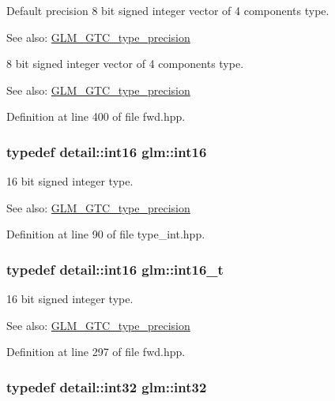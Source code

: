 Default precision 8 bit signed integer vector of 4 components type. \begin{Desc}
\item[See also:]\hyperlink{group__gtc__type__precision}{GLM\_\-GTC\_\-type\_\-precision}\end{Desc}
8 bit signed integer vector of 4 components type. \begin{Desc}
\item[See also:]\hyperlink{group__gtc__type__precision}{GLM\_\-GTC\_\-type\_\-precision} \end{Desc}


Definition at line 400 of file fwd.hpp.\hypertarget{group__gtc__type__precision_g2945a61d12771f8954994fcddf02b021}{
\subsubsection[int16]{\setlength{\rightskip}{0pt plus 5cm}typedef detail::int16 {\bf glm::int16}}}
\label{group__gtc__type__precision_g2945a61d12771f8954994fcddf02b021}


16 bit signed integer type. \begin{Desc}
\item[See also:]\hyperlink{group__gtc__type__precision}{GLM\_\-GTC\_\-type\_\-precision} \end{Desc}


Definition at line 90 of file type\_\-int.hpp.\hypertarget{group__gtc__type__precision_gf89ee61e0d34aa4a462104b7ae7f2da6}{
\subsubsection[int16\_\-t]{\setlength{\rightskip}{0pt plus 5cm}typedef detail::int16 {\bf glm::int16\_\-t}}}
\label{group__gtc__type__precision_gf89ee61e0d34aa4a462104b7ae7f2da6}


16 bit signed integer type. \begin{Desc}
\item[See also:]\hyperlink{group__gtc__type__precision}{GLM\_\-GTC\_\-type\_\-precision} \end{Desc}


Definition at line 297 of file fwd.hpp.\hypertarget{group__gtc__type__precision_g632d8b25f6b61659f39ea4321fab92a4}{
\subsubsection[int32]{\setlength{\rightskip}{0pt plus 5cm}typedef detail::int32 {\bf glm::int32}}}
\label{group__gtc__type__precision_g632d8b25f6b61659f39ea4321fab92a4}


